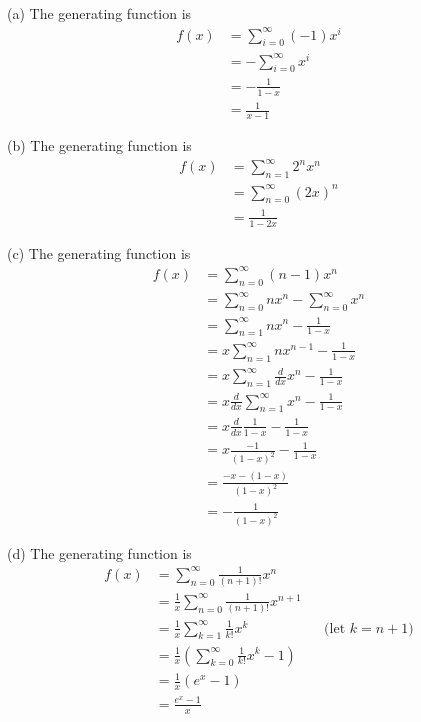 
(a)
The generating function is
\begin{align*}
  f(x) &= \sum_{i=0}^\infty (-1)x^i \\
  &= - \sum_{i=0}^\infty x^i \\
  &= - \frac{1}{1 - x} \\
  &= \frac{1}{x - 1} 
\end{align*}

(b)
The generating function is
\begin{align*}
  f(x) &= \sum_{n=1}^\infty 2^nx^n \\
  &= \sum_{n=0}^\infty (2x)^n \\
  &= \frac{1}{1 - 2x} 
\end{align*}

(c)
The generating function is
\begin{align*}
  f(x) &= \sum_{n=0}^\infty (n-1)x^n \\
  &= \sum_{n=0}^\infty nx^n - \sum_{n=0}^\infty x^n \\
  &= \sum_{n=1}^\infty nx^{n} - \frac{1}{1 - x} \\
  &= x\sum_{n=1}^\infty nx^{n-1} - \frac{1}{1 - x} \\
  &= x \sum_{n=1}^\infty \frac{d}{dx} x^{n} - \frac{1}{1 - x} \\
  &= x \frac{d}{dx} \sum_{n=1}^\infty x^{n} - \frac{1}{1 - x} \\
  &= x \frac{d}{dx} \frac{1}{1 - x} - \frac{1}{1 - x} \\
  &= x \frac{-1}{(1 - x)^2} - \frac{1}{1 - x} \\
  &= \frac{-x - (1 - x)}{(1 - x)^2}  \\
  &= -\frac{1}{(1 - x)^2}  
\end{align*}


(d)
The generating function is
\begin{align*}
  f(x) &= \sum_{n=0}^\infty \frac{1}{(n+1)!} x^n \\
  &= \frac{1}{x}\sum_{n=0}^\infty \frac{1}{(n+1)!} x^{n+1} \\
  &= \frac{1}{x}\sum_{k=1}^\infty \frac{1}{k!} x^{k} & & \text{(let $k = n + 1$)}\\
  &= \frac{1}{x}
  \left(
  \sum_{k=0}^\infty \frac{1}{k!} x^{k} - 1
  \right)\\
  &= \frac{1}{x}
  \left(
  e^x - 1
  \right)\\
  &= \frac{e^x - 1}{x}
\end{align*}
